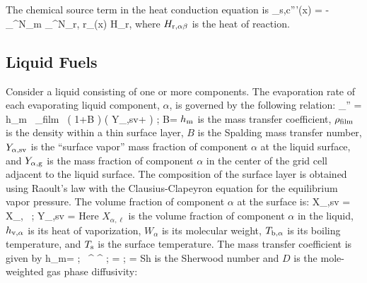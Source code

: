 The chemical source term in the heat conduction equation is
\be
\label{eq:qchem_solid}
_{\rm s,c}'''(x) = - \sum_{}^{N_{\rm m}} \sum_{}^{N_{\rm r,\alpha}}  r_{\alpha \beta}(x) H_{\rm r,\alpha \beta}
\ee
where $H_{\rm r,\alpha \beta}$ is the heat of reaction.


\subsection{Liquid Fuels}

Consider a liquid consisting of one or more components. The evaporation rate of each evaporating liquid component, $\alpha$, is governed by the following relation:
\be
{}_\alpha'' = h_{\rm m} \, \rho_{\rm film} \, \ln \left( 1+B \right) \left( Y_{\alpha,{\rm sv}}+ \right) \quad ; \quad B=  \label{mdot_alpha}
\ee
$h_{\rm m}$ is the mass transfer coefficient, $\rho_{\rm film}$ is the density within a thin surface layer, $B$ is the Spalding mass transfer number, $Y_{\alpha,{\rm sv}}$ is the ``surface vapor'' mass fraction of component $\alpha$ at the liquid surface, and $Y_{\alpha,{\rm g}}$ is the mass fraction of component $\alpha$ in the center of the grid cell adjacent to the liquid surface. The composition of the surface layer is obtained using Raoult's law with the Clausius-Clapeyron equation for the equilibrium vapor pressure.  The volume fraction of component $\alpha$ at the surface is:
\be
   X_{\alpha,{\rm sv}} = X_{\alpha,\ell} \, \exp {}  \quad ; \quad
   Y_{\alpha,{\rm sv}} = 
   \label{CC_liquid}
\ee
Here $X_{\alpha,\ell}$ is the volume fraction of component $\alpha$ in the liquid, $h_{\rm v,\alpha}$ is its heat of vaporization, $W_\alpha$ is its molecular weight, $T_{\rm b,\alpha}$ is its boiling temperature, and $T_{\rm s}$ is the surface temperature.  The mass transfer coefficient is given by
\be
h_{\rm m}=  \quad ; \quad {}~\SC^{} \RE^{} \quad ; = \quad ; \quad \RE= 
\ee
Sh is the Sherwood number and $D$ is the mole-weighted gas phase diffusivity:
